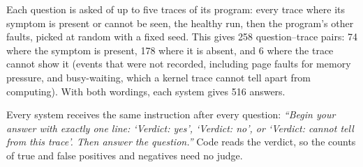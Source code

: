 Each question is asked of up to five traces of its program: every trace where its symptom is present or cannot be seen, the healthy run, then the program's other faults, picked at random with a fixed seed. This gives 258 question--trace pairs: 74 where the symptom is present, 178 where it is absent, and 6 where the trace cannot show it (events that were not recorded, including page faults for memory pressure, and busy-waiting, which a kernel trace cannot tell apart from computing). With both wordings, each system gives 516 answers.

Every system receives the same instruction after every question: \emph{``Begin your answer with exactly one line: `Verdict: yes', `Verdict: no', or `Verdict: cannot tell from this trace'. Then answer the question.''} Code reads the verdict, so the counts of true and false positives and negatives need no judge.
